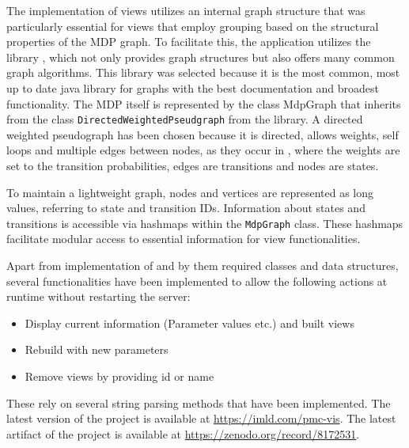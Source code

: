 \documentclass[preview]{standalone}
\begin{document}
The implementation of views utilizes an internal graph structure that was particularly essential for views that employ grouping based on the structural properties of the MDP graph. To facilitate this, the application utilizes the \jgrapht library \cite{Michail2020}, which not only provides graph structures but also offers many common graph algorithms. This library was selected because it is the most common, most up to date java library for graphs with the best documentation and broadest functionality. The MDP itself is represented by the class MdpGraph that inherits from the class \texttt{DirectedWeightedPseudgraph} from the \jgrapht library. A directed weighted pseudograph has been chosen because it is directed, allows weights, self loops and multiple edges between nodes, as they occur in \chgphsN, where the weights are set to the transition probabilities, edges are transitions and nodes are states.

To maintain a lightweight graph, nodes and vertices are represented as long values, referring to state and transition IDs. Information about states and transitions is accessible via hashmaps within the \texttt{MdpGraph} class. These hashmaps facilitate modular access to essential information for view functionalities.

Apart from implementation of \viewsN and by them required classes and data structures, several functionalities have been implemented to allow the following actions at runtime without restarting the server:
\begin{itemize}
	\item Display current \viewN information (Parameter values etc.) and built views
	\item Rebuild \viewN with new parameters
	\item Remove views by providing id or name		
\end{itemize}

These rely on several string parsing methods that have been implemented. The latest version of the project \pmcvis is available at \url{https://imld.com/pmc-vis}. The latest artifact of the project is available at \url{https://zenodo.org/record/8172531}.
\end{document}
